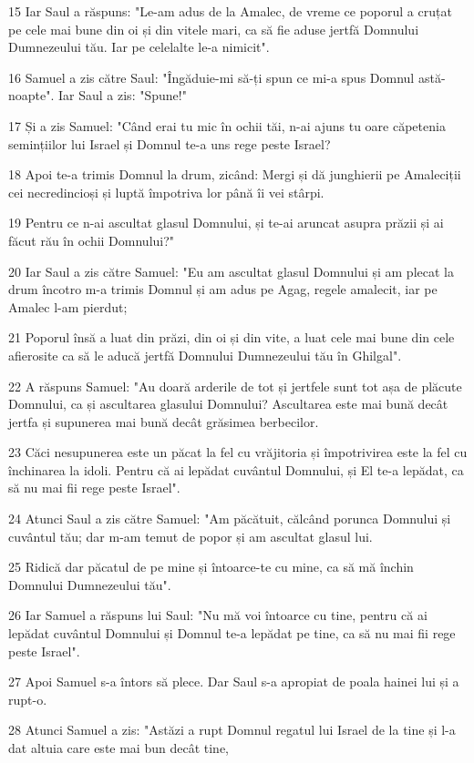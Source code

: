 \par 15 Iar Saul a răspuns: "Le-am adus de la Amalec, de vreme ce poporul a cruțat pe cele mai bune din oi și din vitele mari, ca să fie aduse jertfă Domnului Dumnezeului tău. Iar pe celelalte le-a nimicit".
\par 16 Samuel a zis către Saul: "Îngăduie-mi să-ți spun ce mi-a spus Domnul astă-noapte". Iar Saul a zis: "Spune!"
\par 17 Și a zis Samuel: "Când erai tu mic în ochii tăi, n-ai ajuns tu oare căpetenia semințiilor lui Israel și Domnul te-a uns rege peste Israel?
\par 18 Apoi te-a trimis Domnul la drum, zicând: Mergi și dă junghierii pe Amaleciții cei necredincioși și luptă împotriva lor până îi vei stârpi.
\par 19 Pentru ce n-ai ascultat glasul Domnului, și te-ai aruncat asupra prăzii și ai făcut rău în ochii Domnului?"
\par 20 Iar Saul a zis către Samuel: "Eu am ascultat glasul Domnului și am plecat la drum încotro m-a trimis Domnul și am adus pe Agag, regele amalecit, iar pe Amalec l-am pierdut;
\par 21 Poporul însă a luat din prăzi, din oi și din vite, a luat cele mai bune din cele afierosite ca să le aducă jertfă Domnului Dumnezeului tău în Ghilgal".
\par 22 A răspuns Samuel: "Au doară arderile de tot și jertfele sunt tot așa de plăcute Domnului, ca și ascultarea glasului Domnului? Ascultarea este mai bună decât jertfa și supunerea mai bună decât grăsimea berbecilor.
\par 23 Căci nesupunerea este un păcat la fel cu vrăjitoria și împotrivirea este la fel cu închinarea la idoli. Pentru că ai lepădat cuvântul Domnului, și El te-a lepădat, ca să nu mai fii rege peste Israel".
\par 24 Atunci Saul a zis către Samuel: "Am păcătuit, călcând porunca Domnului și cuvântul tău; dar m-am temut de popor și am ascultat glasul lui.
\par 25 Ridică dar păcatul de pe mine și întoarce-te cu mine, ca să mă închin Domnului Dumnezeului tău".
\par 26 Iar Samuel a răspuns lui Saul: "Nu mă voi întoarce cu tine, pentru că ai lepădat cuvântul Domnului și Domnul te-a lepădat pe tine, ca să nu mai fii rege peste Israel".
\par 27 Apoi Samuel s-a întors să plece. Dar Saul s-a apropiat de poala hainei lui și a rupt-o.
\par 28 Atunci Samuel a zis: "Astăzi a rupt Domnul regatul lui Israel de la tine și l-a dat altuia care este mai bun decât tine,
